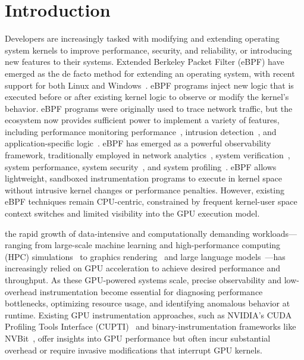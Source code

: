 \section{Introduction} 

Developers are increasingly tasked with modifying and extending operating system kernels to improve performance, security, and reliability, or introducing new features to their systems. Extended Berkeley Packet Filter (eBPF) have emerged as the de facto method for extending an operating system, with recent support for both Linux and Windows~\cite{eBPFWindows}.  
eBPF programs inject new logic that is executed before or after existing kernel logic to observe or modify the kernel's behavior. 
eBPF programs were originally used to trace network traffic, but the ecosystem now provides sufficient power to implement a variety of features, including performance monitoring performance~\cite{gregg16,gregg2021computing}, intrusion detection~\cite{Bachl21,jia2023practical}, and application-specific logic~\cite{Zhong22,yang2023lambda,jia2023programmable,ghigoff2021bmc}. eBPF has emerged as a powerful observability framework, traditionally employed in network analytics~\cite{ghigoff2021bmc,chen2025etran,xu2025state,benson2024netedit,zhou2024dint}, system verification~\cite {wu2025vep,bpftime}, system performance\cite{mao2024merlin}, system security~\cite {jin2024beebox,wang2024seak}, and system profiling~\cite{zhong2022xrp,yang2023lambda}. eBPF allows lightweight, sandboxed instrumentation programs to execute in kernel space without intrusive kernel changes or performance penalties. 
However, existing eBPF techniques remain CPU-centric, constrained by frequent kernel-user space context switches and limited visibility into the GPU execution model.

the rapid growth of data-intensive and computationally demanding workloads—ranging from large-scale machine learning and high-performance computing (HPC) simulations~\cite{kousha2019designing,shen2018cudaadvisor,zhou2021measurement,stocks2024breaking,das2023large,fedeli2022pushing,liu2021closing} to graphics rendering~\cite{pankratz2021vulkan,sellers2016vulkan} and large language models~\cite{guan2024amanda,kwon2023efficient}—has increasingly relied on GPU acceleration to achieve desired performance and throughput. 
As these GPU-powered systems scale, precise observability and low-overhead instrumentation become essential for diagnosing performance bottlenecks, optimizing resource usage\cite{hong2017gpu,kato2011timegraph}, and identifying anomalous behavior at runtime. 
Existing GPU instrumentation approaches, such as NVIDIA’s CUDA Profiling Tools Interface (CUPTI)~\cite{cupti} and binary-instrumentation frameworks like NVBit~\cite{villa2019nvbit}, offer insights into GPU performance but often incur substantial overhead or require invasive modifications that interrupt GPU kernels.

